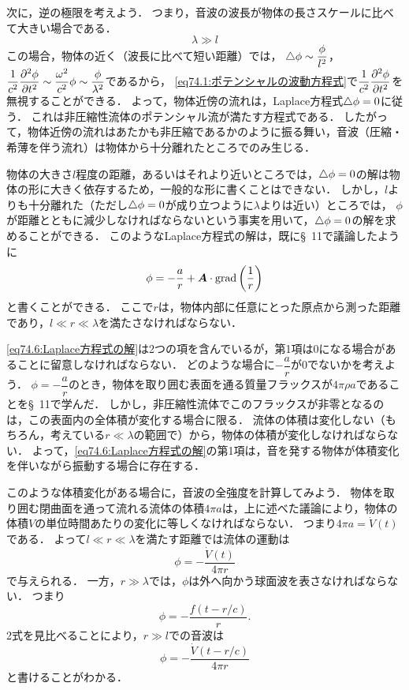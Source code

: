 次に，逆の極限を考えよう．
つまり，音波の波長が物体の長さスケールに比べて大きい場合である．
\begin{equation}
    \lambda \gg l
\end{equation}
この場合，物体の近く（波長に比べて短い距離）では，
$\triangle\phi \sim \dfrac{\phi}{l^2}$，$\dfrac{1}{c^2} \dpdv[2]{\phi}{t} \sim \dfrac{\omega^2}{c^2}\phi \sim \dfrac{\phi}{\lambda^2}$であるから，
\eqref{eq74.1:ポテンシャルの波動方程式}で$\dfrac{1}{c^2} \dpdv[2]{\phi}{t}$を無視することができる．
よって，物体近傍の流れは，Laplace方程式$\triangle\phi=0$に従う．
これは非圧縮性流体のポテンシャル流が満たす方程式である．
したがって，物体近傍の流れはあたかも非圧縮であるかのように振る舞い，音波（圧縮・希薄を伴う流れ）は物体から十分離れたところでのみ生じる．


物体の大きさ$l$程度の距離，あるいはそれより近いところでは，$\triangle\phi=0$の解は物体の形に大きく依存するため，一般的な形に書くことはできない．
しかし，$l$よりも十分離れた（ただし$\triangle\phi=0$が成り立つように$\lambda$よりは近い）ところでは，
$\phi$が距離とともに減少しなければならないという事実を用いて，$\triangle\phi=0$の解を求めることができる．
このようなLaplace方程式の解は，既に\S~11で議論したように
\begin{equation}\label{eq74.6:Laplace方程式の解}
    \phi = - \frac{a}{r} + \vb*{A}\cdot\operatorname{grad}\left( \frac{1}{r} \right)
\end{equation}
と書くことができる．
ここで$r$は，物体内部に任意にとった原点から測った距離であり，$l \ll r \ll \lambda$を満たさなければならない．



\eqref{eq74.6:Laplace方程式の解}は2つの項を含んでいるが，第1項は0になる場合があることに留意しなければならない．
どのような場合に$-\dfrac{a}{r}$が0でないかを考えよう．
$\phi=-\dfrac{a}{r}$のとき，物体を取り囲む表面を通る質量フラックスが$4\pi\rho a$であることを\S~11で学んだ．
しかし，非圧縮性流体でこのフラックスが非零となるのは，この表面内の全体積が変化する場合に限る．
流体の体積は変化しない（もちろん，考えている$r \ll \lambda$の範囲で）から，物体の体積が変化しなければならない．
よって，\eqref{eq74.6:Laplace方程式の解}の第1項は，音を発する物体が体積変化を伴いながら振動する場合に存在する．



このような体積変化がある場合に，音波の全強度を計算してみよう．
物体を取り囲む閉曲面を通って流れる流体の体積$4\pi a$は，上に述べた議論により，物体の体積$V$の単位時間あたりの変化に等しくなければならない．
つまり$4\pi a = \dot{V}(t)$である．
よって$l \ll r \ll \lambda$を満たす距離では流体の運動は
\[
    \phi = - \frac{\dot{V}(t)}{4\pi r}
\]
で与えられる．
一方，$r \gg \lambda$では，$\phi$は外へ向かう球面波を表さなければならない．
つまり
\begin{equation}
    \phi = - \frac{f(t-r/c)}{r}.
\end{equation}
2式を見比べることにより，$r \gg l$での音波は
\begin{equation}
    \phi = - \frac{\dot{V}(t-r/c)}{4\pi r}
\end{equation}
と書けることがわかる．

